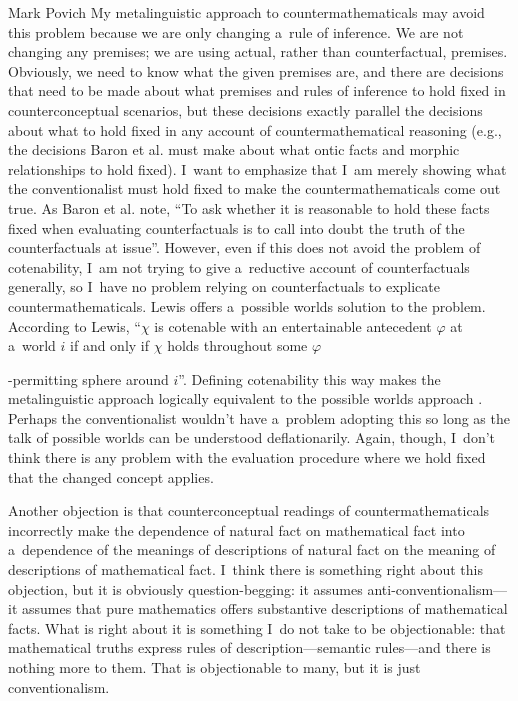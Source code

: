\begin{artengenv}{Mark Povich}
My metalinguistic approach to countermathematicals may avoid this problem because we are only changing a~rule of inference. We are not changing any premises; we are using actual, rather than counterfactual, premises. Obviously, we need to know what the given premises are, and there are decisions that need to be made about what premises and rules of inference to hold fixed in counterconceptual scenarios, but these decisions exactly parallel the decisions about what to hold fixed in any account of countermathematical reasoning (e.g., the decisions Baron et al. must make about what ontic facts and morphic relationships to hold fixed). I~want to emphasize that I~am merely showing what the conventionalist must hold fixed to make the countermathematicals come out true. As Baron et al.
\parencite*[][p.12]{baron_how_2017} %
 note, ``To ask whether it is reasonable to hold these facts fixed when evaluating counterfactuals is to call into doubt the truth of the counterfactuals at issue''. However, even if this does not avoid the problem of cotenability, I~am not trying to give a~reductive account of counterfactuals generally, so I~have no problem relying on counterfactuals to explicate countermathematicals. Lewis 
\parencite*[][p.69]{lewis_counterfactuals_1973} %
 offers a~possible worlds solution to the problem. According to Lewis, ``$\chi $ is cotenable with an entertainable antecedent $\varphi $ at a~world $i$ if and only if $\chi $ holds throughout some $\varphi${-permitting sphere around $i$''. Defining cotenability this way makes the metalinguistic approach logically equivalent to the possible worlds approach 
\parencite[][p.69]{lewis_counterfactuals_1973}. %
 Perhaps the conventionalist wouldn't have a~problem adopting this so long as the talk of possible worlds can be understood deflationarily. Again, though, I~don't think there is any problem with the evaluation procedure where we hold fixed that the changed concept applies.

Another objection is that counterconceptual readings of countermathematicals incorrectly make the dependence of natural fact on mathematical fact into a~dependence of the meanings of descriptions of natural fact on the meaning of descriptions of mathematical fact. I~think there is something right about this objection, but it is obviously question-begging: it assumes anti-conventionalism---it assumes that pure mathematics offers substantive descriptions of mathematical facts. What is right about it is something I~do not take to be objectionable: that mathematical truths express rules of description---semantic rules---and there is nothing more to them. That is objectionable to many, but it is just conventionalism.

}
\end{artengenv}
